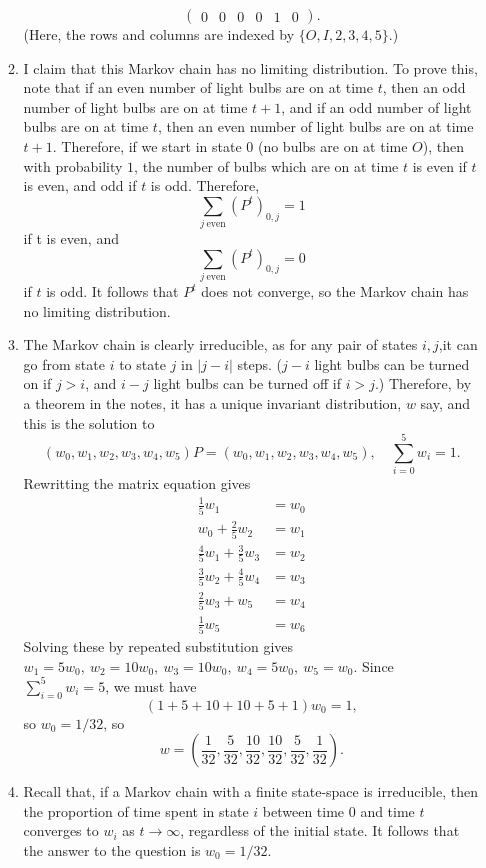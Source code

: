 \documentclass[11pt,a4paper]{article}
\begin{document}
\begin{enumerate}
\begin{enumerate}
$$\begin{pmatrix}
                0 & 0 & 0 & 0 & 1 & 0
            \end{pmatrix}
            .
            $$
            (Here, the rows and columns are indexed by $\{O, I, 2, 3, 4, 5\}$.)
            \item I claim that this Markov chain has no limiting distribution. To prove this, note that if an even number of light bulbs are on at time $t$, then an odd number of light bulbs are on at time $t + 1$, and if an odd number of light bulbs are on at time $t$, then an even number of light bulbs are on at time $t + 1$. Therefore, if we start in state $0$ (no bulbs are on at time $O$), then with probability $1$, the number of bulbs which are on at time $t$ is even if $t$ is even, and odd if $t$ is odd. Therefore,
            $$
            \sum_{j\ \text{even}}(P^t)_{0,j} = 1
            $$
            if t is even, and
            $$
            \sum_{j\ \text{even}}(P^t)_{0,j} = 0
            $$
            if $t$ is odd. It follows that $P^t$ does not converge, so the Markov chain has no limiting distribution.
            \item  The Markov chain is clearly irreducible, as for any pair of states $i, j$,it can go from state $i$ to state $j$ in $|j - i|$ steps. ($j-i$ light bulbs can be turned on if $j>i$, and $i-j$ light bulbs can be turned off if $i>j$.) Therefore, by a theorem in the notes, it has a unique invariant distribution, $w$ say, and this is the solution to
            $$
            (w_0, w_1, w_2, w_3, w_4, w_5)P = (w_0, w_1, w_2, w_3, w_4, w_5),\quad \sum_{i = 0}^5 w_i =1.
            $$
            Rewritting the matrix equation gives
            \begin{align*}
                \frac{1}{5}w_1 & =w_0\\
                w_0 + \frac{2}{5}w_2 &= w_1\\
                \frac{4}{5}w_1 + \frac{3}{5}w_3 &= w_2\\
                \frac{3}{5}w_2 + \frac{4}{5}w_4 &= w_3\\
                \frac{2}{5}w_3 + w_5 &= w_4\\
                \frac{1}{5}w_5 &= w_6
            \end{align*}
            Solving these by repeated substitution gives $w_1 = 5w_0,\ w_2 = 10w_0,\ w_3 = 10w_0,\ w_4 = 5w_0,\ w_5 = w_0$. Since $\sum_{i=0}^5w_i = 5$, we must have
            $$(1 + 5 + 10 + 10 + 5 + 1)w_0 = 1,$$
            so $w_0 = 1/32$, so 
            $$w = \left(\frac{1}{32}, \frac{5}{32}, \frac{10}{32}, \frac{10}{32}, \frac{5}{32},\frac{1}{32}\right).$$
            \item Recall that, if a Markov chain with a finite state-space is irreducible, then the proportion of time spent in state $i$ between time $0$ and time $t$ converges to $w_i$ as $t \to \infty$, regardless of the initial state. It follows that the answer to the question is $w_0 = 1/32$.
        \end{enumerate}
    \end{enumerate}
\end{document}
